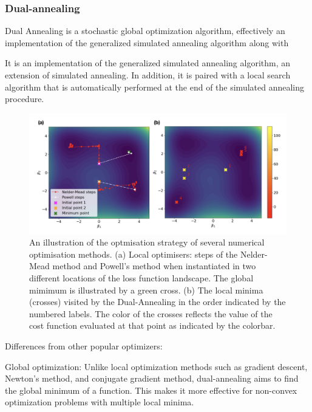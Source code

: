 \subsubsection{Dual-annealing}\label{sec:3.1.3.3_dual_annealing}

Dual Annealing is a stochastic global optimization algorithm, effectively an implementation of the generalized simulated annealing algorithm \cite{tsallis_generalized_1996} along with 

It is an implementation of the generalized simulated annealing algorithm, an extension of simulated annealing. In addition, it is paired with a local search algorithm that is automatically performed at the end of the simulated annealing procedure.


\begin{figure}[t]
\centering
\includegraphics[width=\linewidth]{images/optimiser_plots.png} \caption[Visualising optimisers in action]{An illustration of the optmisation strategy of several numerical optimisation methods. (a) Local optimisers: steps of the Nelder-Mead method and Powell's method when instantiated in two different locations of the loss function landscape. The global mimimum is illustrated by a green cross. (b) The local minima (crosses) visited by the Dual-Annealing in the order indicated by the numbered labels. The color of the crosses reflects the value of the cost function evaluated at that point as indicated by the colorbar.}\label{fig:optimisers}
\end{figure}

Differences from other popular optimizers:

Global optimization: Unlike local optimization methods such as gradient descent, Newton's method, and conjugate gradient method, dual-annealing aims to find the global minimum of a function. This makes it more effective for non-convex optimization problems with multiple local minima.

